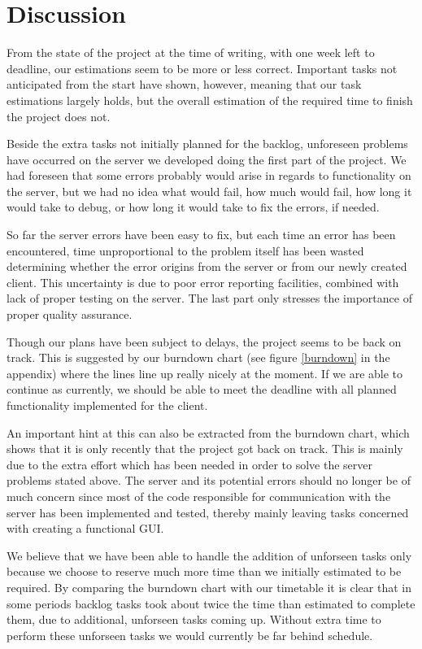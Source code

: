 \section{Discussion}
From the state of the project at the time of writing, with one week left to deadline, our estimations seem to be more or less correct. Important tasks not anticipated from the start have shown, however, meaning that our task estimations largely holds, but the overall estimation of the required time to finish the project does not.

Beside the extra tasks not initially planned for the backlog, unforeseen problems have occurred on the server we developed doing the first part of the project.
We had foreseen that some errors probably would arise in regards to functionality on the server, but we had no idea what would fail, how much would fail, how long it would take to debug, or how long it would take to fix the errors, if needed.

So far the server errors have been easy to fix, but each time an error has been encountered, time unproportional to the problem itself has been wasted determining whether the error origins from the server or from our newly created client.
This uncertainty is due to poor error reporting facilities, combined with lack of proper testing on the server. The last part only stresses the importance of proper quality assurance.

Though our plans have been subject to delays, the project seems to be back on track. This is suggested by our burndown chart (see figure \ref{burndown} in the appendix) where the lines line up really nicely at the moment. If we are able to continue as currently, we should be able to meet the deadline with all planned functionality implemented for the client.

An important hint at this can also be extracted from the burndown chart, which shows that it is only recently that the project got back on track. This is mainly due to the extra effort which has been needed in order to solve the server problems stated above.
The server and its potential errors should no longer be of much concern since most of the code responsible for communication with the server has been implemented and tested, thereby mainly leaving tasks concerned with creating a functional GUI.

We believe that we have been able to handle the addition of unforseen tasks only because we choose to reserve much more time than we initially estimated to be required. By comparing
the burndown chart with our timetable it is clear that in some periods backlog tasks took about twice the time than estimated to complete them, due to additional, unforseen tasks coming up. Without extra time to perform these unforseen tasks we would currently be far behind schedule.

